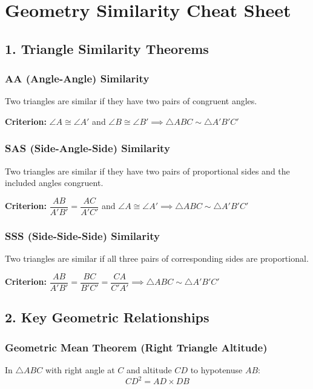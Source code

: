 \documentclass{article}
\begin{document}

\section*{Geometry Similarity Cheat Sheet}

\subsection*{1. Triangle Similarity Theorems}

\subsubsection*{AA (Angle-Angle) Similarity}
Two triangles are similar if they have two pairs of congruent angles.

\textbf{Criterion:} $\angle A \cong \angle A'$ and $\angle B \cong \angle B' \implies \triangle ABC \sim \triangle A'B'C'$

\subsubsection*{SAS (Side-Angle-Side) Similarity}
Two triangles are similar if they have two pairs of proportional sides and the included angles congruent.

\textbf{Criterion:} $\dfrac{AB}{A'B'} = \dfrac{AC}{A'C'}$ and $\angle A \cong \angle A' \implies \triangle ABC \sim \triangle A'B'C'$

\subsubsection*{SSS (Side-Side-Side) Similarity}
Two triangles are similar if all three pairs of corresponding sides are proportional.

\textbf{Criterion:} $\dfrac{AB}{A'B'} = \dfrac{BC}{B'C'} = \dfrac{CA}{C'A'} \implies \triangle ABC \sim \triangle A'B'C'$

\subsection*{2. Key Geometric Relationships}

\subsubsection*{Geometric Mean Theorem (Right Triangle Altitude)}
In $\triangle ABC$ with right angle at $C$ and altitude $CD$ to hypotenuse $AB$:
\[
CD^2 = AD \times DB
\]
\end{document}
